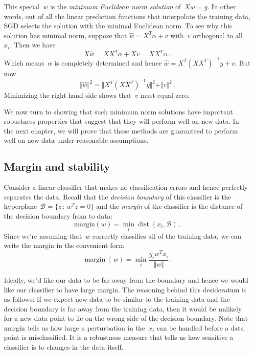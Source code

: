 \documentclass{tufte-book}
\begin{document}
This special~\(w\) is the \emph{minimum Euclidean norm solution}
of~\(Xw=y\). In other words, out of all the linear prediction functions
that interpolate the training data, SGD selects the solution with the
minimal Euclidean norm. To see why this solution has minimal norm,
suppose that \(\hat{w} = X^T\alpha + v\) with~\(v\) orthogonal to
all~\(x_i\). Then we have \[
X\hat{w} = XX^T\alpha + Xv = XX^T\alpha \,.
\] Which means~\(\alpha\) is completely determined and hence
\(\hat{w} = X^T(XX^T)^{-1}y+ v\). But now \[
    \Vert \hat{w}\Vert^2 = \Vert X^T(XX^T)^{-1}y\Vert^2 + \Vert v \Vert^2\,.
\] Minimizing the right hand side shows that~\(v\) must equal zero.

We now turn to showing that such minimum norm solutions have important
robustness properties that suggest that they will perform well on new
data. In the next chapter, we will prove that these methods are
guaranteed to perform well on new data under reasonable assumptions.

\hypertarget{margin-and-stability}{%
\subsection{Margin and stability}\label{margin-and-stability}}


Consider a linear classifier that makes no classification errors and
hence perfectly separates the data. Recall that the \emph{decision
boundary} of this classifier is the
hyperplane~\(\mathcal{B}= \{z\,:\,w^Tz = 0\}\) and the \emph{margin} of
the classifier is the distance of the decision boundary from to data: \[
    \mathrm{margin}(w) = \min_i \operatorname{dist}\left(x_i,\mathcal{B}\right)\,.
\] Since we're assuming that~\(w\) correctly classifies all of the
training data, we can write the margin in the convenient form \[
    \operatorname{margin}(w) = \min_i \frac{y_i w^Tx_i}{\Vert w\Vert}\,.
\]

Ideally, we'd like our data to be far away from the boundary and hence
we would like our classifier to have large margin. The reasoning behind
this desideratum is as follows: If we expect new data to be similar to
the training data and the decision boundary is far away from the
training data, then it would be unlikely for a new data point to lie on
the wrong side of the decision boundary. Note that margin tells us how
large a perturbation in the~\(x_i\) can be handled before a data point
is misclassified. It is a robustness measure that tells us how sensitive
a classifier is to changes in the data itself.
\end{document}
